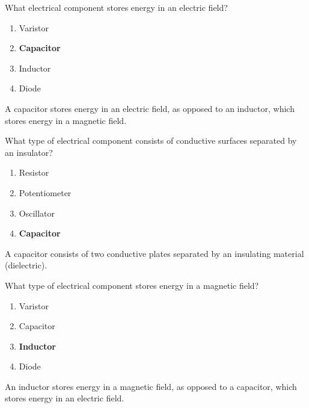 
\begin{tcolorbox}[colback=gray!10!white,colframe=black!75!black,title={T6A04}]
    What electrical component stores energy in an electric field?
    \begin{enumerate}[label=\Alph*,noitemsep]
        \item Varistor
        \item \textbf{Capacitor}
        \item Inductor
        \item Diode
    \end{enumerate}
\end{tcolorbox}
A capacitor stores energy in an electric field, as opposed to an inductor, which stores energy in a magnetic field.


\begin{tcolorbox}[colback=gray!10!white,colframe=black!75!black,title={T6A05}]
    What type of electrical component consists of conductive surfaces separated by an insulator?
    \begin{enumerate}[label=\Alph*,noitemsep]
        \item Resistor
        \item Potentiometer
        \item Oscillator
        \item \textbf{Capacitor}
    \end{enumerate}
\end{tcolorbox}
A capacitor consists of two conductive plates separated by an insulating material (dielectric).


\begin{tcolorbox}[colback=gray!10!white,colframe=black!75!black,title={T6A06}]
    What type of electrical component stores energy in a magnetic field?
    \begin{enumerate}[label=\Alph*,noitemsep]
        \item Varistor
        \item Capacitor
        \item \textbf{Inductor}
        \item Diode
    \end{enumerate}
\end{tcolorbox}
An inductor stores energy in a magnetic field, as opposed to a capacitor, which stores energy in an electric field.

